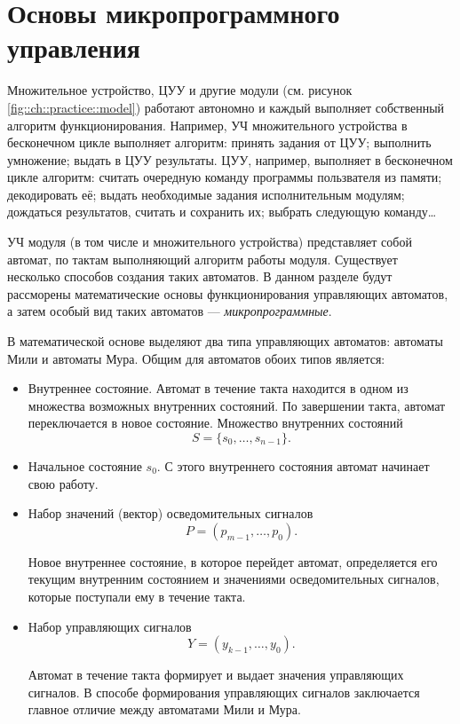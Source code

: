 \section{Основы микропрограммного управления}
\label{ch::practice::programming}

Множительное устройство, ЦУУ и другие модули (см. рисунок \ref{fig::ch::practice::model}) работают автономно и каждый выполняет собственный алгоритм функционирования. Например, УЧ множительного устройства в бесконечном цикле выполняет алгоритм: принять задания от ЦУУ; выполнить умножение; выдать в ЦУУ результаты. ЦУУ, например, выполняет в бесконечном цикле алгоритм: считать очередную команду программы пользвателя из памяти; декодировать её; выдать необходимые задания исполнительным модулям; дождаться результатов, считать и сохранить их; выбрать следующую команду\ldots

УЧ модуля (в том числе и множительного устройства) представляет собой автомат, по тактам выполняющий алгоритм работы модуля. Существует несколько способов создания таких автоматов. В данном разделе будут рассморены математические основы функционирования управляющих автоматов, а затем особый вид таких автоматов --- \emph{микропрограммные}.

В математической основе выделяют два типа управляющих автоматов: автоматы Мили и автоматы Мура. Общим для автоматов обоих типов является:
\begin{itemize}
    \item Внутреннее состояние. Автомат в течение такта находится в одном из множества возможных внутренних состояний. По завершении такта, автомат переключается в новое состояние. Множество внутренних состояний 
    \[ 
        S=\{s_0,\ldots,s_{n-1}\}.
    \]
    
    \item Начальное состояние $s_0$. С этого внутреннего состояния автомат начинает свою работу.
    
    \item Набор значений (вектор) осведомительных сигналов
    \[
        P=(p_{m-1},\ldots,p_0).
    \]
	
	Новое внутреннее состояние, в которое перейдет автомат, определяется его текущим внутренним состоянием и значениями осведомительных сигналов, которые поступали ему в течение такта.
    
    
    \item Набор управляющих сигналов
    \[
        Y=(y_{k-1},\ldots,y_0).
    \]
	
	Автомат в течение такта формирует и выдает значения управляющих сигналов. В способе формирования  управляющих сигналов заключается главное отличие между автоматами Мили и Мура.
\end{itemize}

